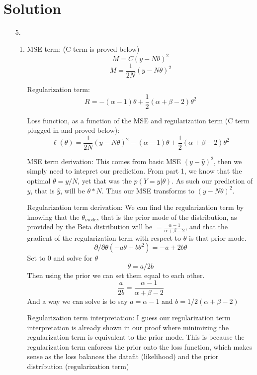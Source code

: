 \documentclass[submit]{harvardml}
\newenvironment{answer}
  {\section*{Solution}}
{}
\begin{document}
\begin{answer}
\begin{enumerate}
\begin{enumerate}
      \end{enumerate}

    \item[5.]

      \begin{enumerate}
        \item
              MSE term: (C term is proved below)
              \[
                M = C(y-N\theta)^2 
              \]
              \[
                M = \frac{1}{2N}(y-N\theta)^2
              \]

              Regularization term:
              \[
                R = -(\alpha -1)\theta +\frac{1}{2}(\alpha+\beta-2)\theta^2
              \]

              Loss function, as a function of the MSE and regularization term (C term plugged in and proved below):
              \[
                \ell(\theta) = \frac{1}{2N}(y-N\theta)^2 -(\alpha -1)\theta +\frac{1}{2}(\alpha+\beta-2)\theta^2 
              \]

              MSE term derivation: This comes from basic MSE $(y-\hat{y})^2$, then we simply need to intepret our prediction. From part 1, we know that the optimal $\theta = y/N$, yet that was the $p(Y=y|\theta)$. As such our prediction of $y$, that is $\hat{y}$, will be $\theta*N$. Thus our MSE transforms to $(y-N\theta)^2$.

              Regularization term derivation: We can find the regularization term by knowing that the $\theta_{mode}$, that is the prior mode of the distribution, as provided by the Beta distribution will be $=\frac{\alpha-1}{\alpha+\beta-2}$, and that the gradient of the regularization term with respect to $\theta$ is that prior mode. 
              $$\partial/\partial\theta(-a\theta+b\theta^2)= -a +2b\theta$$
              Set to 0 and solve for $\theta$
              $$\theta = a/2b$$
              Then using the prior we can set them equal to each other.
              $$\frac{a}{2b} = \frac{\alpha-1}{\alpha+\beta-2}$$
              And a way we can solve is to say $a = \alpha-1$ and $b=1/2(\alpha+\beta-2)$

              Regularization term interpretation: I guess our regularization term interpretation is already shown in our proof where minimizing the regularization term is equivalent to the prior mode. This is because the regularization term enforces the prior onto the loss function, which makes sense as the loss balances the datafit (likelihood) and the prior distribution (regularization term)


\end{enumerate}
\end{enumerate}
\end{answer}
\end{document}
